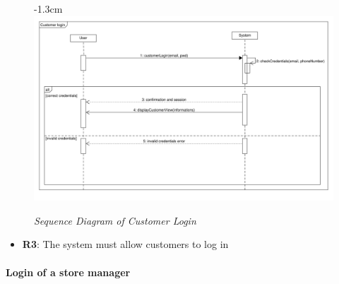\documentclass{article}
\begin{document}
\begin{center}
					\begin{figure}[!h]
						\begin{adjustwidth} {-1.3cm}{}
							\centering
							\includegraphics[scale=0.36]{SD/3_customerLogin.pdf}\\
							\caption{\emph{Sequence Diagram of Customer Login}}
						\end{adjustwidth}
					\end{figure}

					\begin{itemize}
					\bigskip
					\bigskip
					\bigskip
					 {\bfseries Required functional requirements: }
					\item {\bfseries R3}: The system must allow customers to log in

					\end{itemize}

				\end{center}
			
					\bigskip
					\bigskip
					\bigskip
			\paragraph{Login of a store manager}
			
\end{document}
